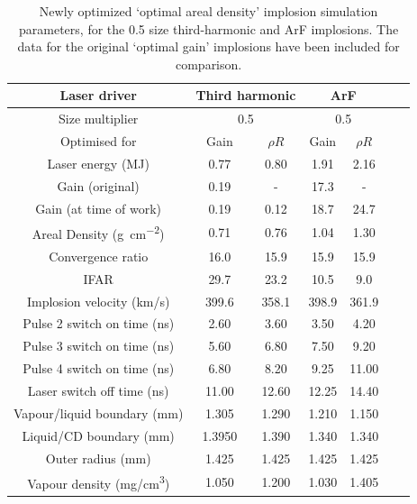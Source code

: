 \begin{table}
\centering
\begin{tabular}{|c|c|c|c|c|c|c|}
\hline
Laser driver & \multicolumn{2}{c|}{Third harmonic} & \multicolumn{2}{c|}{ArF} \\ 
\hline
Size multiplier & \multicolumn{2}{c|}{0.5} & \multicolumn{2}{c|}{0.5} \\ 
\hline
Optimised for & Gain & $\rho R$ & Gain & $\rho R$  \\
\hline
Laser energy (MJ)  & 0.77 & 0.80 & 1.91 & 2.16 \\ 
Gain (original) &  0.19 & - & 17.3 & -\\ 
Gain (at time of work) &  0.19 & 0.12 & 18.7 & 24.7\\ 
Areal Density (\unit{\gram\per\centi\meter\squared}) & 0.71 & 0.76 & 1.04 & 1.30\\
Convergence ratio  & 16.0 & 15.9 & 15.9 & 15.9 \\ 
IFAR  & 29.7 & 23.2 & 10.5 & 9.0 \\ 
Implosion velocity (km/s)  & 399.6 & 358.1 & 398.9 & 361.9\\ 
Pulse 2 switch on time (ns)  & 2.60 & 3.60 & 3.50 & 4.20\\ 
Pulse 3 switch on time (ns) & 5.60 & 6.80 & 7.50 & 9.20\\ 
Pulse 4 switch on time (ns)  & 6.80 & 8.20 & 9.25 & 11.00 \\ 
Laser switch off time (ns)  & 11.00 & 12.60 & 12.25 & 14.40 \\ 
Vapour/liquid boundary (\si[per-mode=symbol]{\milli\meter})  & 1.305 & 1.290 & 1.210 & 1.150\\ 
Liquid/CD boundary (\si[per-mode=symbol]{\milli\meter})  & 1.3950 & 1.390 & 1.340 & 1.340\\ 
Outer radius (\si[per-mode=symbol]{\milli\meter})  & 1.425 & 1.425 & 1.425 & 1.425\\ 
Vapour density (\si[per-mode=symbol]{\milli\gram\per\centi\meter\cubed})  & 1.050 & 1.200 & 1.030 & 1.405\\
\hline
  \end{tabular}
  \caption{Newly optimized `optimal areal density' implosion simulation parameters, for the 0.5 size third-harmonic and ArF implosions. The data for the original `optimal gain' implosions have been included for comparison.}
  \label{tab:Optimal Areal Density}
\end{table}

